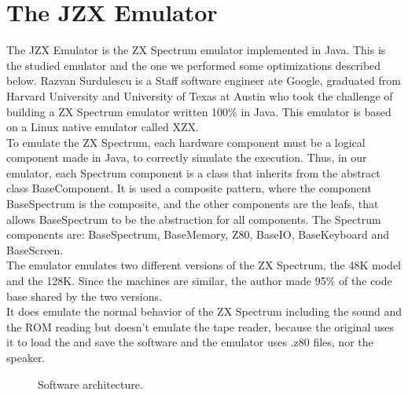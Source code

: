 \section{The JZX Emulator}
The JZX Emulator is the ZX Spectrum emulator implemented in Java. This is the studied emulator and the one we performed some optimizations described below.
Razvan Surdulescu is a Staff software engineer ate Google, graduated from Harvard University and University of Texas at Austin who took the challenge of building a ZX Spectrum emulator written 100\% in Java. This emulator is based on a Linux native emulator called XZX.\\
\indent To emulate the ZX Spectrum, each hardware component must be a logical component made in Java, to correctly simulate the execution. Thus, in our emulator, each Spectrum component is a class that inherits from the abstract class BaseComponent. It is used a composite pattern, where the component BaseSpectrum is the composite, and the other components are the leafs, that allows BaseSpectrum to be the abstraction for all components. The Spectrum components are: BaseSpectrum, BaseMemory, Z80, BaseIO, BaseKeyboard and  BaseScreen.\\
\indent The emulator emulates two different versions of the ZX Spectrum, the 48K model and the 128K. Since the machines are similar, the author made 95\% of the code base shared by the two versions.\\
\indent It does emulate the normal behavior of the ZX Spectrum including the sound and the ROM reading but doesn't emulate the tape reader, because the original uses it to load the and save the software and the emulator uses .z80 files, nor the speaker.
\begin{figure}
	\caption{Software architecture.}
\end{figure}

